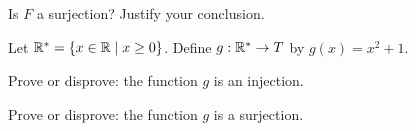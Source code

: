 \begin{pa}
	\item Is $F$ a surjection? Justify your conclusion.

	\ea

\item Let $\mathbb{R}^*= \{x \in \mathbb{R} \mid x \geq 0\}$. Define $g : \mathbb{R}^* \to T$ by $g(x) = x^2 + 1$. 
	\ba
	\item Prove or disprove: the function $g$ is an injection.  

	\item Prove or disprove: the function $g$ is a surjection.

	\ea

\ee

\end{pa}

\begin{comment}

\ActivitySolution
\be
\item Let $h = f \mid_\R^+$, where $\R^+$ is the set of positive real numbers. 
	\ba
	\item Suppose $h(x) = h(y)$ for some $x, y \in \R^+$. Then $x^2+1 = y^2 + 1$ or $x^2 = y^2$. Since $x$ and $y$ are positive, this implies that $x = y$ and $h$ is an injection.

	\item The answer is no. Since $h(x) = x^2 + 1 \geq 1$, there is no input into $h$ that produces the output $0$.
	
	\ea

\item Let $T = \{y \in \R \mid y \geq 1\}$, and let $F: \R \to T$ be defined by $F(x) = f(x)$. 
	\ba
	\item Note that $F(-1) = 2 = F(1)$. Since $-1 \neq 1$ it follows that $F$ is not an injection.

	\item Yes, $F$ is a surjection. to see why, let $y \in T$. Then $y \geq 1$ so $y - 1 \geq 0$. Thus, $x = \sqrt{y-1}$ is a real number and $F(x) = (\sqrt{y-1})^2 + 1 = y$. Therefore, $F$ is a surjection.  	
	
	\ea

\item Let $\R^*= \{x \in \R \mid x \geq 0\}$. Define $g : \R^* \to T$ by $g(x) = x^2 + 1$. 
	\ba
	\item  Suppose $g(x) = g(y)$ for some $x, y \in \R^*$. Then $x^2+1 = y^2 + 1$ or $x^2 = y^2$. Since $x$ and $y$ are nonnegative, this implies that $x = y$ and $g$ is an injection.
	
	\item Let $y \in T$. Then $y \geq 1$ so $y - 1 \geq 0$. Thus, $x = \sqrt{y-1}$ is a nonnegative real number and $g(x) = (\sqrt{y-1})^2 + 1 = y$. Therefore, $g$ is a surjection.  
	\ea

\ee

\end{comment}


